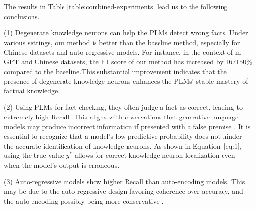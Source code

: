 \documentclass[]{article}
\begin{document}
The results in Table \ref{table:combined-experiments} lead us to the following conclusions.

(1) Degenerate knowledge neurons can help the PLMs detect wrong facts. Under various settings, our method is better than the baseline method, especially for Chinese datasets and auto-regressive models. For instance, in the context of m-GPT and Chinese datasets, the F1 score of our method has increased by 167150\% compared to the baseline.This substantial improvement indicates that the presence of degenerate knowledge neurons enhances the PLMs' stable mastery of factual knowledge.

(2) Using PLMs for fact-checking, they often judge a fact as correct, leading to extremely high Recall. This aligns with observations that generative language models may produce incorrect information if presented with a false premise \cite{hallucination_chatgpt3, lakshmanan2022large, metz2022new}.
It is essential to recognize that a model's low predictive probability does not hinder the accurate identification of knowledge neurons. As shown in Equation~\ref{eq:1}, using the true value \( y^* \) allows for correct knowledge neuron localization even when the model's output is erroneous.


(3) Auto-regressive models show higher Recall than auto-encoding models. This may be due to the auto-regressive design favoring coherence over accuracy, and the auto-encoding possibly being more conservative  \cite{zhou2023comprehensive}.
\end{document}
